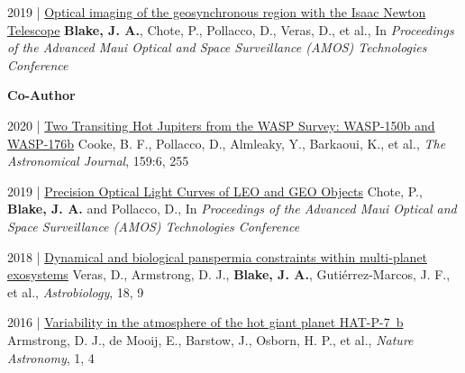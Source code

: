 \documentclass[10pt,a4paper]{altacv}
\begin{document}
\smallskip

\small
2019 | \href{https://www.researchgate.net/publication/338337216_Optical_imaging_of_faint_geosynchronous_debris_with_the_Isaac_Newton_Telescope}{Optical imaging of the geosynchronous region with the Isaac Newton Telescope}
\textbf{Blake, J. A.}, Chote, P., Pollacco, D., Veras, D., et al., In \textit{Proceedings of the Advanced Maui Optical and Space Surveillance (AMOS) Technologies Conference}

\divider

\normalsize \textbf{Co-Author} 

\medskip

\small
2020 | \href{https://iopscience.iop.org/article/10.3847/1538-3881/ab88db/meta}{Two Transiting Hot Jupiters from the WASP Survey: WASP-150b and WASP-176b}
Cooke, B. F., Pollacco, D., Almleaky, Y., Barkaoui, K., et al., \textit{The Astronomical Journal}, 159:6, 255

\smallskip 

\small
2019 | \href{https://www.researchgate.net/publication/338450520_Precision_Optical_Light_Curves_of_LEO_and_GEO_Objects}{Precision Optical Light Curves of LEO and GEO Objects}
Chote, P., \linebreak\textbf{Blake, J. A.} and Pollacco, D., In \textit{Proceedings of the Advanced Maui Optical and Space Surveillance (AMOS) Technologies Conference}

\smallskip

\small
2018 | \href{https://www.liebertpub.com/doi/abs/10.1089/ast.2017.1786}{Dynamical and biological panspermia constraints within multi-planet exosystems}
Veras, D., Armstrong, D. J., \textbf{Blake, J. A.}, Guti{\'e}rrez-Marcos, J. F., et al., \textit{Astrobiology}, 18, 9

\smallskip 

\small 
2016 | \href{https://www.nature.com/articles/s41550-016-0004}{Variability in the atmosphere of the hot giant planet HAT-P-7~b}
Armstrong, D. J., de Mooij, E., Barstow, J., Osborn, H. P., et al., \textit{Nature Astronomy}, 1, 4 
\end{document}
